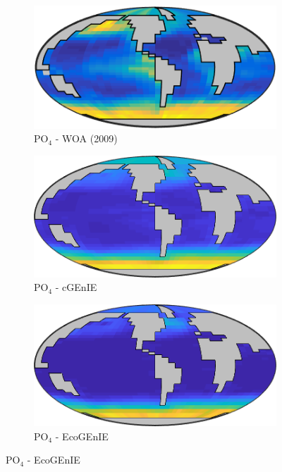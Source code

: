 \documentclass{article}
\begin{document}
\begin{figure}[htp]
 \centering
\begin{subfigure}{.33\textwidth}
 \caption{PO$_4$ - WOA (2009)}
 \includegraphics[width=0.95\linewidth]{../Separate_figures/OBSERVATIONS/surface_p_an.png}
\end{subfigure}%
\begin{subfigure}{.33\textwidth}
 \caption{PO$_4$ - cGEnIE}
 \includegraphics[width=0.95\linewidth]{../Separate_figures/BIOGEM/ocn_PO4.png}
\end{subfigure}%
\begin{subfigure}{.33\textwidth}
 \caption{PO$_4$ - EcoGEnIE}
 \includegraphics[width=0.95\linewidth]{../Separate_figures/ECOGEM/ocn_PO4.png}

\end{subfigure}
\end{figure}
\end{document}
